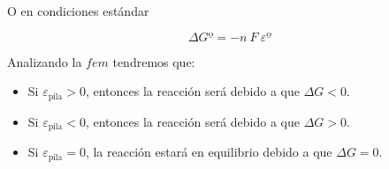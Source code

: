     O en condiciones estándar

    \begin{equation}
        \Delta G\text{º} = -n\ F\ \varepsilon\text{º}\label{eq:G-vs-faraday}
    \end{equation}

    Analizando la \(fem\) tendremos que:

    \begin{itemize}
        \item Si \(\varepsilon_{\text{pila}} > 0\), entonces la reacción será  debido a que \(\Delta G <0\).
        \item Si \(\varepsilon_{\text{pila}} < 0\), entonces la reacción  será  debido a que \(\Delta G > 0\).
        \item Si \(\varepsilon_{\text{pila}} = 0\), la reacción estará en equilibrio debido a que \(\Delta G = 0\).
    \end{itemize}

